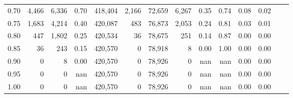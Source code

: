 \begin{tabular}{rrrrrrrrrrrrrr}
0.70 &   4,466 &   6,336 &     0.70 &  418,404 &    2,166 &  72,659 &   6,267 &  0.35 &  0.74 &  0.08 &      0.02 \\
0.75 &   1,683 &   4,214 &     0.40 &  420,087 &      483 &  76,873 &   2,053 &  0.24 &  0.81 &  0.03 &      0.01 \\
0.80 &     447 &   1,802 &     0.25 &  420,534 &       36 &  78,675 &     251 &  0.14 &  0.87 &  0.00 &      0.00 \\
0.85 &      36 &     243 &     0.15 &  420,570 &        0 &  78,918 &       8 &  0.00 &  1.00 &  0.00 &      0.00 \\
0.90 &       0 &       8 &     0.00 &  420,570 &        0 &  78,926 &       0 &   nan &   nan &  0.00 &      0.00 \\
0.95 &       0 &       0 &      nan &  420,570 &        0 &  78,926 &       0 &   nan &   nan &  0.00 &      0.00 \\
1.00 &       0 &       0 &      nan &  420,570 &        0 &  78,926 &       0 &   nan &   nan &  0.00 &      0.00 \\
\bottomrule
\end{tabular}
